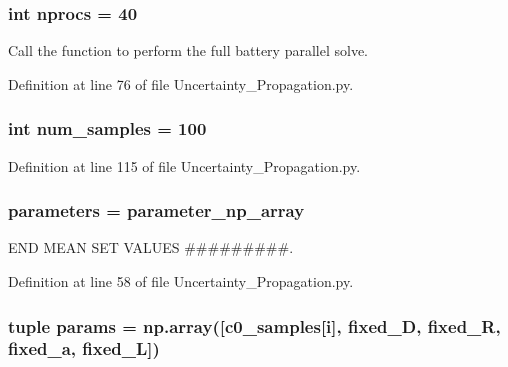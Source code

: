 \hypertarget{namespace_uncertainty___propagation_ad7c4c17cf720ee538e27c02ab356ed6b}{
\subsubsection[{nprocs}]{\setlength{\rightskip}{0pt plus 5cm}int nprocs = 40}}\label{namespace_uncertainty___propagation_ad7c4c17cf720ee538e27c02ab356ed6b}


Call the function to perform the full battery parallel solve. 



Definition at line 76 of file Uncertainty\-\_\-\-Propagation.\-py.

\hypertarget{namespace_uncertainty___propagation_a32bff09a616cee12a2c61815a990152d}{
\subsubsection[{num\-\_\-samples}]{\setlength{\rightskip}{0pt plus 5cm}int num\-\_\-samples = 100}}\label{namespace_uncertainty___propagation_a32bff09a616cee12a2c61815a990152d}


Definition at line 115 of file Uncertainty\-\_\-\-Propagation.\-py.

\hypertarget{namespace_uncertainty___propagation_ad827090038061f4a04a789ab61df8c1d}{
\subsubsection[{parameters}]{\setlength{\rightskip}{0pt plus 5cm}parameters = parameter\-\_\-np\-\_\-array}}\label{namespace_uncertainty___propagation_ad827090038061f4a04a789ab61df8c1d}


E\-N\-D M\-E\-A\-N S\-E\-T V\-A\-L\-U\-E\-S \#\#\#\#\#\#\#\#\#. 



Definition at line 58 of file Uncertainty\-\_\-\-Propagation.\-py.

\hypertarget{namespace_uncertainty___propagation_a347fcfb484b5d7bf36cc0b53a589be83}{
\subsubsection[{params}]{\setlength{\rightskip}{0pt plus 5cm}tuple params = np.\-array(\mbox{[}{\bf c0\-\_\-samples}\mbox{[}i\mbox{]}, {\bf fixed\-\_\-\-D}, {\bf fixed\-\_\-\-R}, {\bf fixed\-\_\-a}, {\bf fixed\-\_\-\-L}\mbox{]})}}\label{namespace_uncertainty___propagation_a347fcfb484b5d7bf36cc0b53a589be83}


